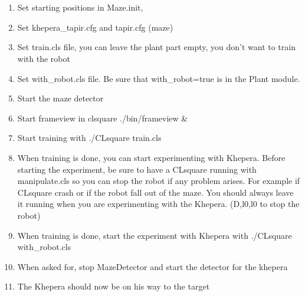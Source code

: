\section{\clsquare}

    \begin{enumerate}
        \item Set starting positions in Maze.init, 
        \item Set khepera\_tapir.cfg and tapir.cfg (maze)
        \item Set train.cls file, you can leave the plant part empty, 
            you don’t want to train with the robot
        \item Set with\_robot.cls file. Be sure that with\_robot=true is in 
            the Plant module.
        \item Start the maze detector 
        \item Start frameview in clsquare ./bin/frameview \&
        \item Start training with ./CLsquare train.cls
        \item When training is done, you can start experimenting with 
            Khepera. Before starting the experiment, be sure to have a 
            CLsquare running with manipulate.cls so you can stop the 
            robot if any problem arises. For example if CLsquare crash 
            or if the robot fall out of the maze. You should always 
            leave it running when you are experimenting with the 
            Khepera. (D,l0,l0 to stop the robot)
        \item When training is done, start the experiment with Khepera 
            with ./CLsquare with\_robot.cls
        \item When asked for, stop MazeDetector and start the detector 
            for the khepera
        \item The Khepera should now be on his way to the target
    \end{enumerate}

